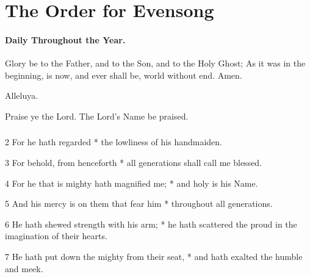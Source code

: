 \chapter{The Order for Evensong}
\subsubsection{Daily Throughout the Year.}
\bigskip
\ourFather

\medskip



\V Glory be to the Father, and to the Son, and to the Holy Ghost;  \R As it was in the beginning, is now, and ever shall be, world without end. Amen.

Alleluya.

{\centering{}\par}

\V Praise ye the Lord.  \R The Lord's Name be praised.

\bigskip


\subsection{}


2 For he hath regarded * the lowliness of his handmaiden.

3 For behold, from henceforth * all generations shall call me blessed.

4 For he that is mighty hath magnified me; * and holy is his Name.

5 And his mercy is on them that fear him * throughout all generations.

6 He hath shewed strength with his arm; * he hath scattered the proud in the imagination of their hearts.

7 He hath put down the mighty from their seat, * and hath exalted the humble and meek.

